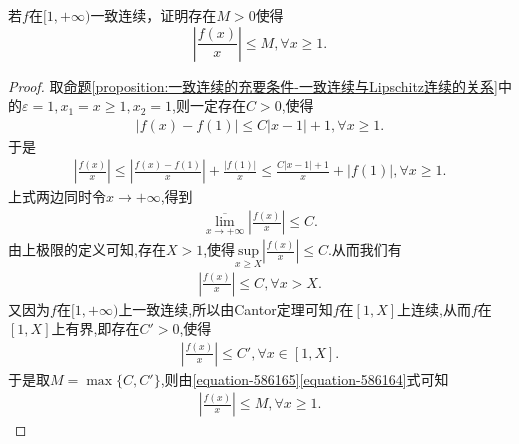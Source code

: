 \documentclass[../../main.tex]{subfiles}%
\begin{document}
\begin{corollary}[一致连续函数的阶的提升]\label{corollary:一致连续函数的阶的提升}
若\(f\)在\([1,+\infty)\)一致连续，证明存在\(M > 0\)使得
\[
\left|\frac{f(x)}{x}\right|\leqslant M,\forall x\geqslant1.
\]
\end{corollary}
\begin{proof}
取\hyperref[proposition:一致连续的充要条件-一致连续与Lipschitz连续的关系]{命题\ref{proposition:一致连续的充要条件-一致连续与Lipschitz连续的关系}}中的$\varepsilon=1,x_1=x\geqslant 1,x_2=1$,则一定存在$C>0$,使得
\begin{align*}
|f(x)-f\left( 1 \right) |\leqslant C|x-1|+1,\forall x\geqslant 1.
\end{align*}
于是
\begin{align*}
\left| \frac{f\left( x \right)}{x} \right|\leqslant \left| \frac{f\left( x \right) -f\left( 1 \right)}{x} \right|+\frac{\left| f\left( 1 \right) \right|}{x}\leqslant \frac{C\left| x-1 \right|+1}{x}+\left| f\left( 1 \right) \right|,\forall x\geqslant 1.
\end{align*}
上式两边同时令$x\to +\infty$,得到
\begin{align*}
\underset{x\rightarrow +\infty}{\overline{\lim }}\left| \frac{f\left( x \right)}{x} \right|\leqslant C.
\end{align*}
由上极限的定义可知,存在$X>1$,使得$\underset{x\geqslant X}{\mathrm{sup}}\left| \frac{f\left( x \right)}{x} \right|\leqslant C$.从而我们有
\begin{align}\label{equation-586165}
\left| \frac{f\left( x \right)}{x} \right|\leqslant C,\forall x>X.
\end{align}
又因为$f$在$[1,+\infty)$上一致连续,所以由Cantor定理可知$f$在$[1,X]$上连续,从而$f$在$[1,X]$上有界,即存在$C'>0$,使得
\begin{align}\label{equation-586164}
\left| \frac{f\left( x \right)}{x} \right|\leqslant C',\forall x\in [1,X].
\end{align}
于是取$M=\max\{C,C'\}$,则由\eqref{equation-586165}\eqref{equation-586164}式可知
\begin{align*}
\left|\frac{f(x)}{x}\right|\leqslant M,\forall x\geqslant1.
\end{align*}
\end{proof}
\end{document}
